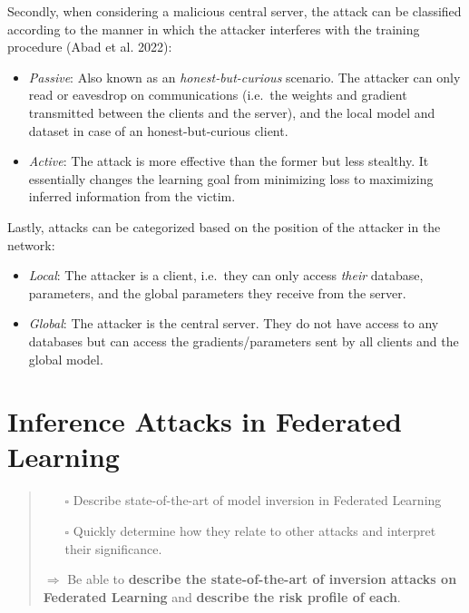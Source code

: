 Secondly, when considering a malicious central server, the attack can be
classified according to the manner in which the attacker interferes with
the training procedure (Abad et al. 2022):

\begin{itemize}
\item
  \emph{Passive}: Also known as an \emph{honest-but-curious} scenario.
  The attacker can only read or eavesdrop on communications (i.e.~the
  weights and gradient transmitted between the clients and the server),
  and the local model and dataset in case of an honest-but-curious
  client.
\item
  \emph{Active}: The attack is more effective than the former but less
  stealthy. It essentially changes the learning goal from minimizing
  loss to maximizing inferred information from the victim.
\end{itemize}

Lastly, attacks can be categorized based on the position of the attacker
in the network:

\begin{itemize}
\item
  \emph{Local}: The attacker is a client, i.e.~they can only access
  \emph{their} database, parameters, and the global parameters they
  receive from the server.
\item
  \emph{Global}: The attacker is the central server. They do not have
  access to any databases but can access the gradients/parameters sent
  by all clients and the global model.
\end{itemize}

\hypertarget{inference-attacks-in-federated-learning}{%
\section{Inference Attacks in Federated
Learning}\label{inference-attacks-in-federated-learning}}

\begin{quote}
\begin{itemize}
\tightlist
\item[$\square$]
  Describe state-of-the-art of model inversion in Federated Learning
\item[$\square$]
  Quickly determine how they relate to other attacks and interpret their
  significance.
\end{itemize}

\(\Rightarrow\) Be able to \textbf{describe the state-of-the-art of
inversion attacks on Federated Learning} and \textbf{describe the risk
profile of each}.
\end{quote}

